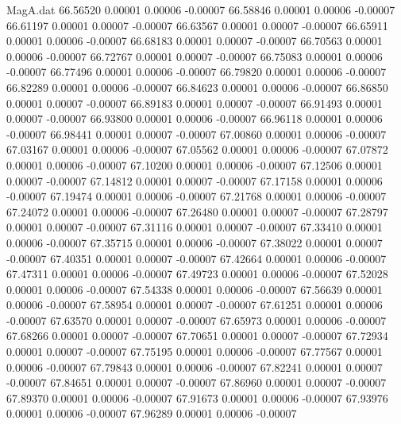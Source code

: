 \begin{filecontents}{MagA.dat}
  66.56520    0.00001    0.00006   -0.00007
  66.58846    0.00001    0.00006   -0.00007
  66.61197    0.00001    0.00007   -0.00007
  66.63567    0.00001    0.00007   -0.00007
  66.65911    0.00001    0.00006   -0.00007
  66.68183    0.00001    0.00007   -0.00007
  66.70563    0.00001    0.00006   -0.00007
  66.72767    0.00001    0.00007   -0.00007
  66.75083    0.00001    0.00006   -0.00007
  66.77496    0.00001    0.00006   -0.00007
  66.79820    0.00001    0.00006   -0.00007
  66.82289    0.00001    0.00006   -0.00007
  66.84623    0.00001    0.00006   -0.00007
  66.86850    0.00001    0.00007   -0.00007
  66.89183    0.00001    0.00007   -0.00007
  66.91493    0.00001    0.00007   -0.00007
  66.93800    0.00001    0.00006   -0.00007
  66.96118    0.00001    0.00006   -0.00007
  66.98441    0.00001    0.00007   -0.00007
  67.00860    0.00001    0.00006   -0.00007
  67.03167    0.00001    0.00006   -0.00007
  67.05562    0.00001    0.00006   -0.00007
  67.07872    0.00001    0.00006   -0.00007
  67.10200    0.00001    0.00006   -0.00007
  67.12506    0.00001    0.00007   -0.00007
  67.14812    0.00001    0.00007   -0.00007
  67.17158    0.00001    0.00006   -0.00007
  67.19474    0.00001    0.00006   -0.00007
  67.21768    0.00001    0.00006   -0.00007
  67.24072    0.00001    0.00006   -0.00007
  67.26480    0.00001    0.00007   -0.00007
  67.28797    0.00001    0.00007   -0.00007
  67.31116    0.00001    0.00007   -0.00007
  67.33410    0.00001    0.00006   -0.00007
  67.35715    0.00001    0.00006   -0.00007
  67.38022    0.00001    0.00007   -0.00007
  67.40351    0.00001    0.00007   -0.00007
  67.42664    0.00001    0.00006   -0.00007
  67.47311    0.00001    0.00006   -0.00007
  67.49723    0.00001    0.00006   -0.00007
  67.52028    0.00001    0.00006   -0.00007
  67.54338    0.00001    0.00006   -0.00007
  67.56639    0.00001    0.00006   -0.00007
  67.58954    0.00001    0.00007   -0.00007
  67.61251    0.00001    0.00006   -0.00007
  67.63570    0.00001    0.00007   -0.00007
  67.65973    0.00001    0.00006   -0.00007
  67.68266    0.00001    0.00007   -0.00007
  67.70651    0.00001    0.00007   -0.00007
  67.72934    0.00001    0.00007   -0.00007
  67.75195    0.00001    0.00006   -0.00007
  67.77567    0.00001    0.00006   -0.00007
  67.79843    0.00001    0.00006   -0.00007
  67.82241    0.00001    0.00007   -0.00007
  67.84651    0.00001    0.00007   -0.00007
  67.86960    0.00001    0.00007   -0.00007
  67.89370    0.00001    0.00006   -0.00007
  67.91673    0.00001    0.00006   -0.00007
  67.93976    0.00001    0.00006   -0.00007
  67.96289    0.00001    0.00006   -0.00007

\end{filecontents}
